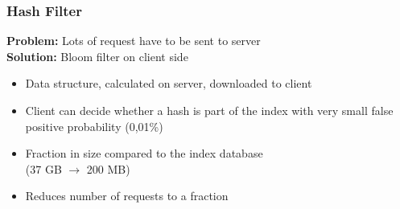 \subsubsection{Hash Filter}
\begin{frame}{\insertsubsection}{\insertsubsubsection}
\textbf{Problem:} Lots of request have to be sent to server\\
\pause
\vspace{2mm}
\textbf{Solution:} Bloom filter on client side
\vspace{2mm}
\begin{itemize}
	\small
	\item Data structure, calculated on server, downloaded to client
	\item Client can decide whether a hash is part of the index with very small false positive probability (0,01\%)
	\item Fraction in size compared to the index database\\ (37 GB $\rightarrow$ 200 MB)
	\item Reduces number of requests to a fraction
\end{itemize}
\end{frame}

